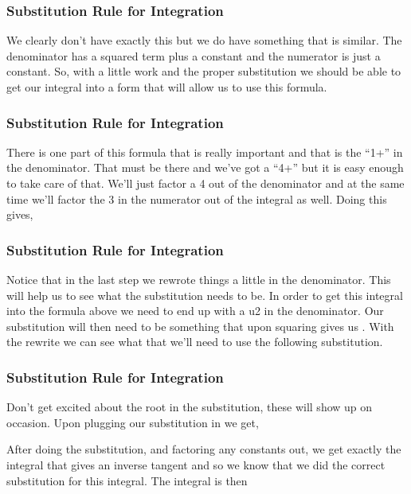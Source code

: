 \documentclass{beamer}
\begin{document}
 \begin{frame}
 	\frametitle{Substitution Rule for Integration}
 	\large
We clearly don’t have exactly this but we do have something that is similar.  The denominator has a squared term plus a constant and the numerator is just a constant.  So, with a little work and the proper substitution we should be able to get our integral into a form that will allow us to use this formula. 
\end{frame}
\begin{frame}
	\frametitle{Substitution Rule for Integration}
	\large
There is one part of this formula that is really important and that is the “1+” in the denominator.  That must be there and we’ve got a “4+” but it is easy enough to take care of that.  We’ll just factor a 4 out of the denominator and at the same time we’ll factor the 3 in the numerator out of the integral as well.  Doing this gives,
                                             
\end{frame}
\begin{frame}
	\frametitle{Substitution Rule for Integration}
	\large 
Notice that in the last step we rewrote things a little in the denominator.  This will help us to see what the substitution needs to be.  In order to get this integral into the formula above we need to end up with a u2 in the denominator.  Our substitution will then need to be something that upon squaring gives us .  With the rewrite we can see what that we’ll need to use the following substitution.
\end{frame}
\begin{frame}
	\frametitle{Substitution Rule for Integration}
	\large

 
Don’t get excited about the root in the substitution, these will show up on occasion.  Upon plugging our substitution in we get,
                                             
 
After doing the substitution, and factoring any constants out, we get exactly the integral that gives an inverse tangent and so we know that we did the correct substitution for this integral.  The integral is then\end{frame}
\end{document}
